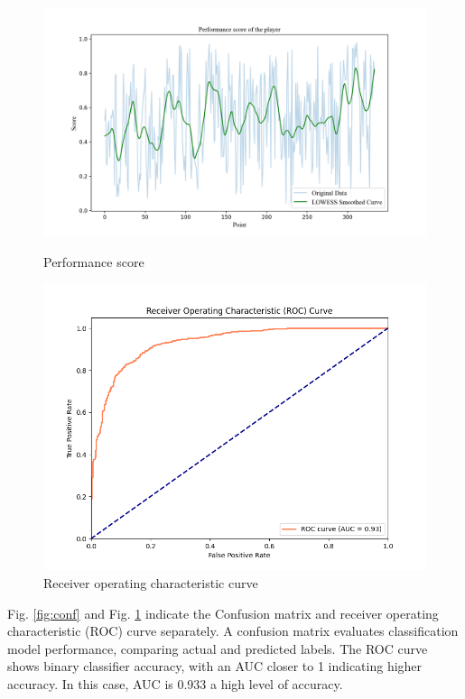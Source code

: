 \documentclass{mcmthesis}
\begin{document}
\begin{figure}[ht]
    \begin{minipage}{0.55\textwidth}
        \centering
        \includegraphics[width=\textwidth]{figures/smooth_curve.png} %
        \caption{Performance score}
        \label{fig:score}
    \end{minipage}\hfill
    \begin{minipage}{0.45\textwidth}
        \centering
        \includegraphics[width=\textwidth]{figures/ROC_Curve.png} %
        \caption{Receiver operating characteristic curve}
        \label{fig:ROC}
    \end{minipage}
\end{figure}

Fig. \ref{fig:conf} and Fig. \ref{fig:ROC} indicate the Confusion matrix and receiver operating characteristic (ROC) curve separately. A confusion matrix evaluates classification model performance, comparing actual and predicted labels. The ROC curve shows binary classifier accuracy, with an AUC closer to 1 indicating higher accuracy. In this case, AUC is 0.933 a high level of accuracy.
\end{document}
